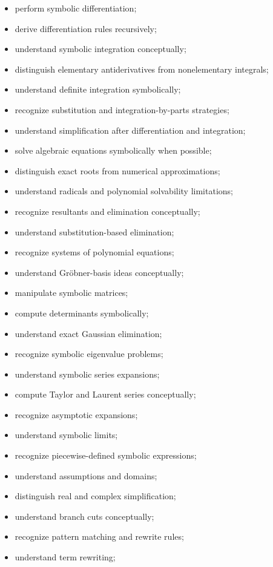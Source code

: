 {\begin{itemize}
    \item perform symbolic differentiation;
    \item derive differentiation rules recursively;
    \item understand symbolic integration conceptually;
    \item distinguish elementary antiderivatives from nonelementary
          integrals;
    \item understand definite integration symbolically;
    \item recognize substitution and integration-by-parts strategies;
    \item understand simplification after differentiation and integration;
    \item solve algebraic equations symbolically when possible;
    \item distinguish exact roots from numerical approximations;
    \item understand radicals and polynomial solvability limitations;
    \item recognize resultants and elimination conceptually;
    \item understand substitution-based elimination;
    \item recognize systems of polynomial equations;
    \item understand Gröbner-basis ideas conceptually;
    \item manipulate symbolic matrices;
    \item compute determinants symbolically;
    \item understand exact Gaussian elimination;
    \item recognize symbolic eigenvalue problems;
    \item understand symbolic series expansions;
    \item compute Taylor and Laurent series conceptually;
    \item recognize asymptotic expansions;
    \item understand symbolic limits;
    \item recognize piecewise-defined symbolic expressions;
    \item understand assumptions and domains;
    \item distinguish real and complex simplification;
    \item understand branch cuts conceptually;
    \item recognize pattern matching and rewrite rules;
    \item understand term rewriting;

\end{itemize}}
